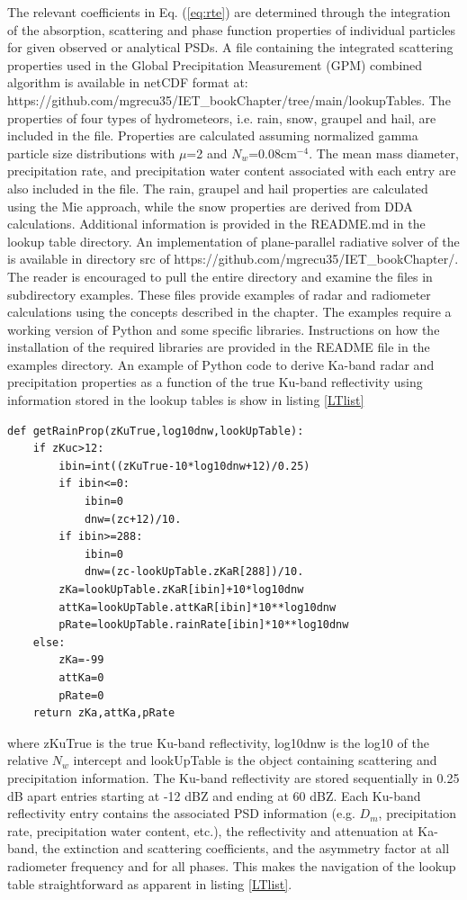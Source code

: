 \documentclass[10pt]{ietbook}
\begin{document}
The relevant coefficients in Eq. (\ref{eq:rte}) are determined through the integration of the absorption, scattering and phase function
properties of individual particles for given observed or analytical PSDs. A file containing the integrated scattering properties used in 
the Global Precipitation Measurement (GPM) combined algorithm \cite{grecu2016} is available in netCDF format at:\\
https://github.com/mgrecu35/IET\_bookChapter/tree/main/lookupTables.
The properties of four types of hydrometeors, i.e. rain, snow, graupel and hail, are included in the file. Properties are calculated assuming
normalized gamma particle size distributions with $\mu$=2 and $N_w$=0.08cm$^{-4}$.  The mean mass diameter, precipitation rate,
and precipitation water content associated with each entry are also included in the file. The rain, graupel and hail properties are calculated using
the Mie approach, while the snow properties are derived from DDA calculations. Additional information is provided in the README.md in the lookup table
directory. An implementation of plane-parallel radiative solver of the \cite{kummerow1993} is available in directory src of 
https://github.com/mgrecu35/IET\_bookChapter/.  The reader is encouraged to pull the entire directory and examine the files in subdirectory examples.
These files provide examples of radar and radiometer calculations using the concepts described in the chapter.  The examples require a working
version of Python and some specific libraries.  Instructions on how the installation of the required libraries are provided in the README file
in the examples directory.  An example of Python code to derive Ka-band radar and precipitation properties as a function of the true Ku-band 
reflectivity using information stored in the lookup tables is show in listing \ref{LTlist}
\begin{lstlisting}[caption={Python implementation of the Histchfeld-Bordan solution.},captionpos=b,label={LTlist}]
def getRainProp(zKuTrue,log10dnw,lookUpTable):
    if zKuc>12:
        ibin=int((zKuTrue-10*log10dnw+12)/0.25)
        if ibin<=0:
            ibin=0
            dnw=(zc+12)/10.
        if ibin>=288:
            ibin=0
            dnw=(zc-lookUpTable.zKaR[288])/10.
        zKa=lookUpTable.zKaR[ibin]+10*log10dnw
        attKa=lookUpTable.attKaR[ibin]*10**log10dnw
        pRate=lookUpTable.rainRate[ibin]*10**log10dnw
    else:
        zKa=-99
        attKa=0
        pRate=0
    return zKa,attKa,pRate
\end{lstlisting}
where zKuTrue is the true Ku-band reflectivity, log10dnw is the log10 of the relative $N_w$ intercept and lookUpTable is the object containing scattering
and precipitation information.  The Ku-band reflectivity are stored sequentially in 0.25 dB apart entries starting at -12 dBZ and ending at 60 dBZ.  Each Ku-band
reflectivity entry contains the associated PSD information (e.g. $D_m$, precipitation rate, precipitation water content, etc.), the reflectivity and attenuation
at Ka-band, the extinction and scattering coefficients, and the asymmetry factor at all radiometer frequency and for all phases. This makes the navigation of
the lookup table straightforward as apparent in listing \ref{LTlist}.
\end{document}
